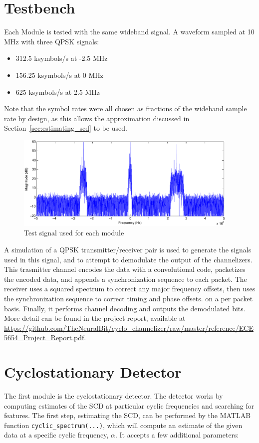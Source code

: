 \documentclass[12pt]{report}
\begin{document}
\section{Testbench}
Each Module is tested with the same wideband signal. A waveform sampled at 10 MHz with three QPSK signals:
\begin{itemize}
    \item{312.5 ksymbols/s at -2.5 MHz}
    \item{156.25 ksymbols/s at 0 MHz}
    \item{625 ksymbols/s at 2.5 MHz}
\end{itemize}
Note that the symbol rates were all chosen as fractions of the wideband sample
rate by design, as this allows the approximation discussed in
Section~\ref{sec:estimating_scd} to be used.

\begin{figure}[h]
    \begin{center}
        \includegraphics[width=0.95\textwidth]{test_signal}
    \end{center}
    \caption{Test signal used for each module}
\end{figure}

A simulation of a QPSK transmitter/receiver pair is used to generate the
signals used in this signal, and to attempt to demodulate the output of the
channelizers. This trasmitter channel encodes the data with a convolutional
code, packetizes the encoded data, and appends a synchronization sequence to
each packet. The receiver uses a squared spectrum to correct any major
frequency offsets, then uses the synchronization sequence to correct timing and
phase offsets. on a per packet basis. Finally, it performs channel decoding and
outputs the demodulated bits. More detail can be found in the project report, available at
\url{https://github.com/TheNeuralBit/cyclo_channelizer/raw/master/reference/ECE5654_Project_Report.pdf}.

\section{Cyclostationary Detector}
\label{sec:sim_cyclo}
The first module is the cyclostationary detector. The detector works by
computing estimates of the SCD at particular cyclic frequencies and searching
for features. The first step, estimating the SCD, can be performed by the
MATLAB function \texttt{cyclic\_spectrum(...)}, which will compute an estimate
of the given data at a specific cyclic frequency, $\alpha$.  It accepts a few
additional parameters:
\end{document}
